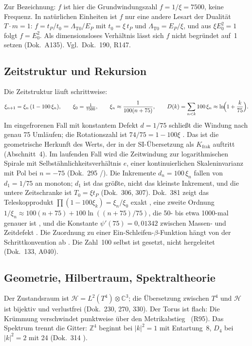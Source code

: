 Zur Bezeichnung: $f$ ist hier die Grundwindungszahl $f = 1/\xi = 7500$, keine Frequenz. In natürlichen Einheiten ist $f$ nur eine andere Lesart der Dualität $T\cdot m = 1$: $f = t_P/t_0 = \Lambda_{\text{T0}}/E_P$ mit $t_0 = \xi\,t_P$ und $\Lambda_{\text{T0}} = E_P/\xi$, und aus $\xi E_0^2 = 1$ folgt $f = E_0^2$. Als dimensionsloses Verhältnis lässt sich $f$ nicht begründet auf~1 setzen (Dok.~A135). Vgl.\ Dok.~190, R147.

\subsection{Zeitstruktur und Rekursion}

Die Zeitstruktur läuft schrittweise:
\begin{equation}
  \xi_{n+1}=\xi_n\,(1-100\,\xi_n),\qquad \xi_0=\tfrac{1}{7500},\qquad
  \xi_n\approx\frac{1}{100(n+75)},\qquad D(k)=\sum_{n<k}100\,\xi_n\approx\ln\!\Bigl(1+\frac{k}{75}\Bigr).
\end{equation}
Im eingefrorenen Fall mit konstantem Defekt $d=1/75$ schließt die Windung nach genau 75
Umläufen; die Rotationszahl ist $74/75=1-100\xi$ \BM. Das ist die geometrische Herkunft des
Werts, der in der SI-Übersetzung als $K_{\text{frak}}$ auftritt (Abschnitt~4). Im laufenden Fall
wird die Zeitwindung zur logarithmischen Spirale mit Selbstähnlichkeitsverhältnis $e$, einer
kontinuierlichen Skaleninvarianz mit Pol bei $n=-75$ (Dok.~295 \BM/\KM). Die Inkremente
$d_n=100\,\xi_n$ fallen von $d_1=1/75$ an monoton; $d_1$ ist das größte, nicht das kleinste
Inkrement, und die untere Zeitschranke ist $T_0=\xi t_P$ (Dok.~306, 307). Dok.~381 zeigt das
Teleskopprodukt $\prod(1-100\xi_k)=\xi_n/\xi_0$ exakt \BM, eine zweite Ordnung
$1/\xi_n\approx100(n+75)+100\ln((n+75)/75)$, die 50- bis etwa 1000-mal genauer ist \KM, und
die Konstante $\psi'(75)=0{,}01342$ zwischen Massen- und Zeitdefekt \KM. Die Zuordnung zu einer
Ein-Schleifen-$\beta$-Funktion hängt von der Schrittkonvention ab \SM. Die Zahl~100 selbst ist
gesetzt, nicht hergeleitet (Dok.~133, A040).

\subsection{Geometrie, Hilbertraum, Spektraltheorie}

Der Zustandsraum ist $\mathcal H=L^2(T^4)\otimes\mathbb C^3$; die Übersetzung zwischen
$T^4$ und $\mathcal H$ ist bijektiv und verlustfrei (Dok.~230, 270, 330). Der Torus ist flach:
Die Krümmung verschwindet punktweise über den Metrikabstieg \BM\ (R95). Das Spektrum trennt
die Gitter: $\mathbb Z^4$ beginnt bei $|k|^2=1$ mit Entartung~8, $D_4$ bei $|k|^2=2$ mit 24
(Dok.~314 \KM).

